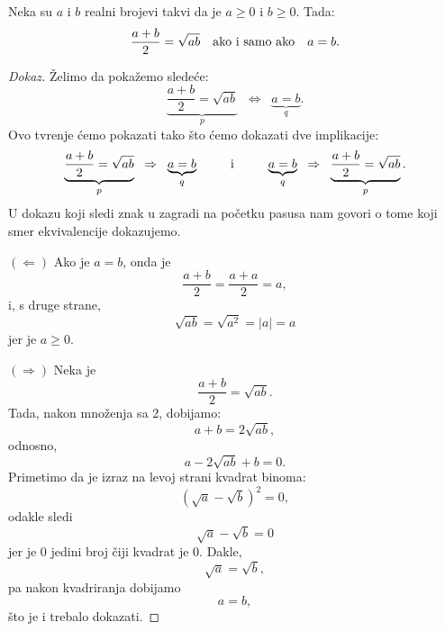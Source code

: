 
\begin{EX}
 Neka su $a$ i $b$ realni brojevi takvi da je $a \ge 0$ i $b \ge 0$. Tada:
 $$
   \frac{a+b}{2} = \sqrt{ab} \text{\quad ako i samo ako\quad} a = b.
 $$
\end{EX}
\begin{proof}[Dokaz]
 \v Zelimo da poka\v zemo slede\'ce:
 $$
   \underbrace{\frac{a+b}{2} = \sqrt{ab}}_p \;\;\Leftrightarrow\;\; \underbrace{a = b}_q.
 $$
 Ovo tvr\dj enje \'cemo pokazati tako \v sto \'cemo dokazati dve implikacije:
 $$
   \underbrace{\frac{a+b}{2} = \sqrt{ab}}_p \;\;\Rightarrow\;\; \underbrace{a = b}_q
   \;\;\text{\qquad i\qquad}\;\;
   \underbrace{a = b}_q \;\;\Rightarrow\;\; \underbrace{\frac{a+b}{2} = \sqrt{ab}}_p.
 $$
 U dokazu koji sledi znak u zagradi na po\v cetku pasusa nam govori o tome koji smer ekvivalencije dokazujemo.

 $(\Leftarrow)$ Ako je $a = b$, onda je
 $$
   \frac{a+b}{2} = \frac{a + a}{2} = a,
 $$
 i, s druge strane,
 $$
   \sqrt{ab} = \sqrt{a^2} = |a| = a
 $$
 jer je $a \ge 0$.
 
 \medskip
 
 $(\Rightarrow)$
 Neka je
 $$
   \frac{a+b}{2} = \sqrt{ab}.
 $$
 Tada, nakon mno\v zenja sa 2, dobijamo:
 $$
   a + b = 2 \sqrt{ab},
 $$
 odnosno,
 $$
   a - 2 \sqrt{ab} + b = 0.
 $$
 Primetimo da je izraz na levoj strani kvadrat binoma:
 $$
   (\sqrt a - \sqrt b)^2 = 0,
 $$
 odakle sledi
 $$
   \sqrt a - \sqrt b = 0
 $$
 jer je 0 jedini broj \v ciji kvadrat je 0. Dakle,
 $$
   \sqrt a = \sqrt b,
 $$
 pa nakon kvadriranja dobijamo
 $$
   a = b,
 $$
 \v sto je i trebalo dokazati.
\end{proof}


  

